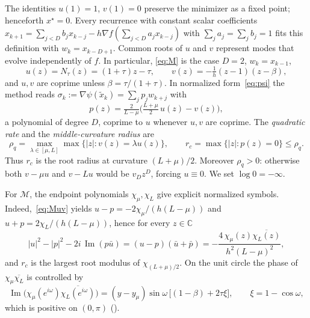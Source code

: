\documentclass[11pt]{article}
\theoremstyle{definition}
\theoremstyle{remark}
\newcommand{\C}{\mathbb C}
\newcommand{\cM}{\mathcal M}
\newcommand{\Ima}{\operatorname{Im}}
\begin{document}
The identities \(u(1)=1\), \(v(1)=0\) preserve the minimizer as a fixed
point; henceforth \(x^\star=0\).  Every recurrence with constant scalar
coefficients
\(x_{k+1}=\sum_{j<D}b_jx_{k-j}-h\nabla f(\sum_{j<D}a_jx_{k-j})\) with
\(\sum_ja_j=\sum_jb_j=1\) fits this definition with \(w_k=x_{k-D+1}\).  Common
roots of \(u\) and \(v\) represent modes that evolve independently of \(f\).  In particular,
\eqref{eq:M} is the case \(D=2\), \(w_k=x_{k-1}\),
\begin{equation}\label{eq:Muv}
u(z)=N_\tau(z)=(1+\tau)z-\tau,\qquad v(z)=-\tfrac1h(z-1)(z-\beta),
\end{equation}
and \(u,v\) are coprime unless \(\beta=\tau/(1+\tau)\).  In normalized
form~\eqref{eq:psi} the method reads
\(\sigma_k:=\nabla\psi(\tilde x_k)=\sum_jp_jw_{k+j}\) with
\begin{equation}\label{eq:p}
p(z)=\tfrac{2}{L-\mu}\bigl(\tfrac{L+\mu}{2}\,u(z)-v(z)\bigr),
\end{equation}
a polynomial of degree \(D\), coprime to \(u\) whenever \(u,v\) are coprime.
The \emph{quadratic rate} and the \emph{middle-curvature radius} are
\[
\rho_q=\max_{\lambda\in[\mu,L]}\max\{|z|:v(z)=\lambda u(z)\},\qquad
r_c=\max\{|z|:p(z)=0\}\le\rho_q.
\]
Thus \(r_c\) is the root radius at curvature \((L+\mu)/2\).
Moreover \(\rho_q>0\): otherwise both \(v-\mu u\) and \(v-Lu\) would
be \(v_Dz^D\), forcing \(u\equiv0\).  We set \(\log0=-\infty\).



For \(\cM\), the endpoint polynomials \(\chi_\mu,\chi_L\) give
explicit normalized symbols.  Indeed,~\eqref{eq:Muv} yields
\(u-p=-2\chi_\mu/(h(L-\mu))\) and \(u+p=2\chi_L/(h(L-\mu))\), hence for
every \(z\in\C\)
\begin{equation}\label{eq:factor}
|u|^2-|p|^2-2i\,\Ima(p\bar u)=(u-p)(\bar u+\bar p)
=-\frac{4\,\chi_\mu(z)\overline{\chi_L(z)}}{h^2(L-\mu)^2},
\end{equation}
and \(r_c\) is the largest root modulus of \(\chi_{(L+\mu)/2}\).  On the
unit circle the phase of \(\chi_\mu\overline{\chi_L}\) is controlled by
\begin{equation}\label{eq:imab}
\Ima\bigl(\chi_\mu(e^{i\omega})\overline{\chi_L(e^{i\omega})}\bigr)
=(y-y_\mu)\sin\omega\,\bigl[(1-\beta)+2\tau\xi\bigr],\qquad\xi=1-\cos\omega,
\end{equation}
which is positive on \((0,\pi)\) ().
\end{document}

